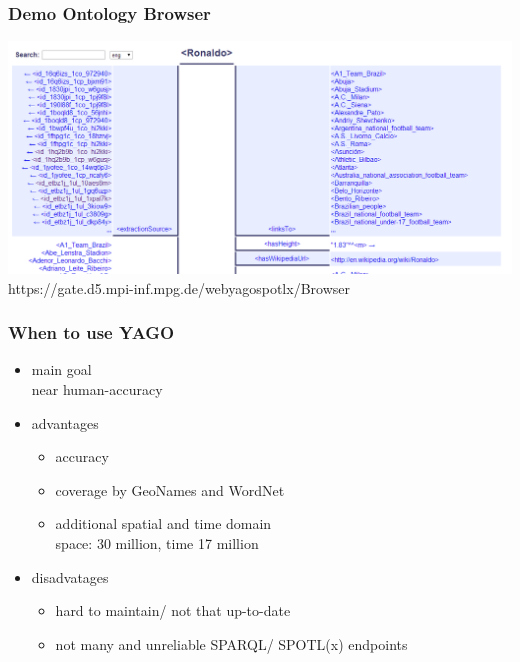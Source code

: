 \begin{frame}
\frametitle{Demo Ontology Browser}
\includegraphics[scale=0.2]{img/yago-obr.png}\\
https://gate.d5.mpi-inf.mpg.de/webyagospotlx/Browser
\end{frame}

\begin{frame}
\frametitle{When to use YAGO}
\begin{itemize}
\item main goal\\
near human-accuracy
\item advantages
\begin{itemize}
\item accuracy
\item coverage by GeoNames and WordNet
\item additional spatial and time domain \\
space: 30 million, time 17 million
\end{itemize}
\item disadvatages
\begin{itemize}
\item hard to maintain/ not that up-to-date
\item not many and unreliable SPARQL/ SPOTL(x) endpoints
\end{itemize}
\end{itemize}
\end{frame}

